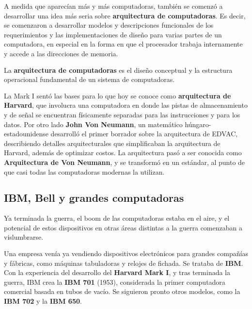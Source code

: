 A medida que aparecían más y más computadoras, también se comenzó a desarrollar
una idea más seria sobre \textbf{arquitectura de computadoras}. Es decir, se
comenzaron a desarrollar modelos y descripciones funcionales de los
requerimientos y las implementaciones de diseño para varias partes de un
computadora, en especial en la forma en que el procesador trabaja internamente
y accede a las direcciones de memoria.

\begin{definition}
    La \textbf{arquitectura de computadoras} es el diseño conceptual y la
    estructura operacional fundamental de un sistema de computadoras.
\end{definition}

 
La Mark I sentó las bases para lo que hoy se conoce como \textbf{arquitectura
de Harvard}, que involucra una computadora en donde las pistas de almacenamiento
y de señal se encuentran físicamente separadas para las instrucciones y para los
datos. Por otro lado \textbf{John Von Neumann}, un matemático húngaro-estadounidense
desarrolló el primer borrador sobre la arquitectura de EDVAC, describiendo
detalles arquitecturales que simplificaban la arquitectura de Harvard, además
de optimizar costos. La arquitectura pasó a ser conocida como \textbf{Arquitectura
de Von Neumann}, y se transformó en un estándar, al punto de que casi todas las
computadoras modernas la utilizan.\autocite[sec 1.11]{patterson_2002}

\subsection{IBM, Bell y grandes computadoras}

Ya terminada la guerra, el boom de las computadoras estaba en el aire, y el
potencial de estos dispositivos en otras áreas distintas a la guerra comenzaban
a vislumbrarse.

Una empresa venía ya vendiendo dispositivos electrónicos para grandes compañías
y fábricas, como máquinas tabuladoras y relojes de fichada. Se trataba de
\textbf{IBM}. Con la experiencia del desarrollo del \textbf{Harvard Mark I},
y tras terminada la guerra, IBM crea la \textbf{IBM 701} (1953), considerada la
primer computadora comercial basada en tubos de vacío. Se siguieron pronto otros
modelos, como la \textbf{IBM 702} y la \textbf{IBM 650}.

